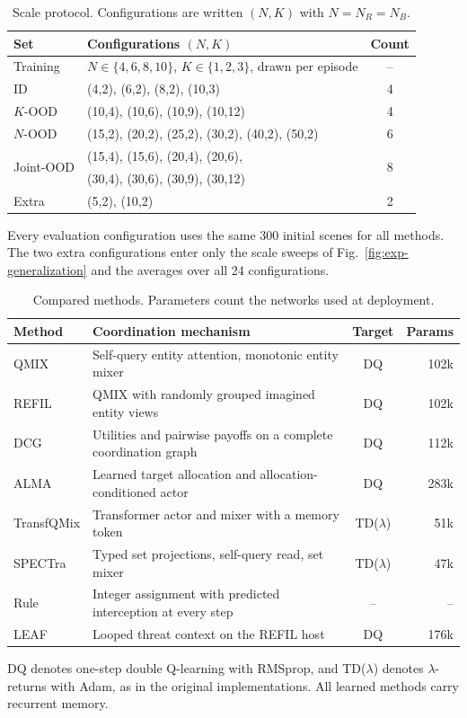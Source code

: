 \begin{table}[!t]
\centering
\footnotesize
\setlength{\tabcolsep}{4pt}
\caption{Scale protocol. Configurations are written $(N,K)$ with $N=N_R=N_B$.}
\label{tab:exp-scales}
\begin{tabular}{@{}llc@{}}
\toprule
Set & Configurations $(N,K)$ & Count\\
\midrule
Training & $N\in\{4,6,8,10\}$, $K\in\{1,2,3\}$, drawn per episode & --\\
ID & (4,2), (6,2), (8,2), (10,3) & 4\\
$K$-OOD & (10,4), (10,6), (10,9), (10,12) & 4\\
$N$-OOD & (15,2), (20,2), (25,2), (30,2), (40,2), (50,2) & 6\\
\multirow{2}{*}{Joint-OOD} & (15,4), (15,6), (20,4), (20,6), & \multirow{2}{*}{8}\\
 & (30,4), (30,6), (30,9), (30,12) & \\
Extra & (5,2), (10,2) & 2\\
\bottomrule
\end{tabular}
\vspace{2pt}

\parbox{\columnwidth}{\footnotesize Every evaluation configuration uses the same 300 initial scenes for all methods. The two extra configurations enter only the scale sweeps of Fig.~\ref{fig:exp-generalization} and the averages over all 24 configurations.}
\end{table}

\begin{table}[!t]
\centering
\footnotesize
\setlength{\tabcolsep}{3pt}
\caption{Compared methods. Parameters count the networks used at deployment.}
\label{tab:exp-methods}
\begin{tabular}{@{}l p{} c r@{}}
\toprule
Method & Coordination mechanism & Target & Params\\
\midrule
QMIX & Self-query entity attention, monotonic entity mixer & DQ & 102k\\
REFIL & QMIX with randomly grouped imagined entity views & DQ & 102k\\
DCG & Utilities and pairwise payoffs on a complete coordination graph & DQ & 112k\\
ALMA & Learned target allocation and allocation-conditioned actor & DQ & 283k\\
TransfQMix & Transformer actor and mixer with a memory token & TD($\lambda$) & 51k\\
SPECTra & Typed set projections, self-query read, set mixer & TD($\lambda$) & 47k\\
Rule & Integer assignment with predicted interception at every step & -- & --\\
LEAF & Looped threat context on the REFIL host & DQ & 176k\\
\bottomrule
\end{tabular}
\vspace{2pt}

\parbox{\columnwidth}{\footnotesize DQ denotes one-step double Q-learning with RMSprop, and TD($\lambda$) denotes $\lambda$-returns with Adam, as in the original implementations. All learned methods carry recurrent memory.}
\end{table}

